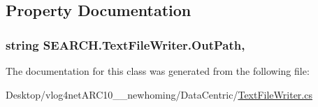 \subsection{Property Documentation}
\hypertarget{class_s_e_a_r_c_h_1_1_text_file_writer_a1de45f2a27a5bfacaaaeff639368b560}{
\subsubsection[{Out\-Path}]{\setlength{\rightskip}{0pt plus 5cm}string S\-E\-A\-R\-C\-H.\-Text\-File\-Writer.\-Out\-Path\hspace{0.3cm}{\ttfamily [get]}, {\ttfamily [set]}}}\label{class_s_e_a_r_c_h_1_1_text_file_writer_a1de45f2a27a5bfacaaaeff639368b560}


The documentation for this class was generated from the following file\-:\begin{DoxyCompactItemize}
\item 
Desktop/vlog4net\-A\-R\-C10\-\_\-\_\-newhoming/\-Data\-Centric/\hyperlink{_text_file_writer_8cs}{Text\-File\-Writer.\-cs}\end{DoxyCompactItemize}
